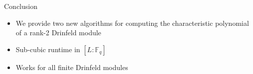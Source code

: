\documentclass{beamer}
\newcommand{\f}{\mathbb{F}}
\begin{document}


    


\begin{frame}{Conclusion}

\begin{itemize}
    \item We provide two new algorithms for computing the characteristic polynomial of a rank-2 Drinfeld module
    \item Sub-cubic runtime in $[L:\f_q]$
    \item Works for all finite Drinfeld modules
\end{itemize}
    
\end{frame}





\end{document}
